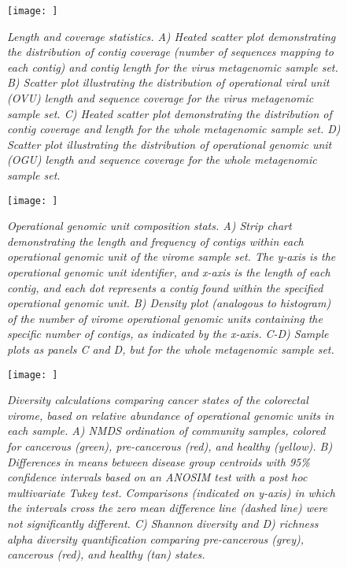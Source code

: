 \documentclass[12pt,]{article}
\begin{document}
\newpage

\begin{figure}[htbp]
\centering
\texttt{[image: ]}
\caption{\emph{Length and coverage statistics. A) Heated scatter plot
demonstrating the distribution of contig coverage (number of sequences
mapping to each contig) and contig length for the virus metagenomic
sample set. B) Scatter plot illustrating the distribution of operational
viral unit (OVU) length and sequence coverage for the virus metagenomic
sample set. C) Heated scatter plot demonstrating the distribution of
contig coverage and length for the whole metagenomic sample set. D)
Scatter plot illustrating the distribution of operational genomic unit
(OGU) length and sequence coverage for the whole metagenomic sample
set.}\label{contigqc}}
\end{figure}

\newpage

\begin{figure}[htbp]
\centering
\texttt{[image: ]}
\caption{\emph{Operational genomic unit composition stats. A) Strip
chart demonstrating the length and frequency of contigs within each
operational genomic unit of the virome sample set. The y-axis is the
operational genomic unit identifier, and x-axis is the length of each
contig, and each dot represents a contig found within the specified
operational genomic unit. B) Density plot (analogous to histogram) of
the number of virome operational genomic units containing the specific
number of contigs, as indicated by the x-axis. C-D) Sample plots as
panels C and D, but for the whole metagenomic sample
set.}\label{clustercontigqc}}
\end{figure}

\newpage

\begin{figure}[htbp]
\centering
\texttt{[image: ]}
\caption{\emph{Diversity calculations comparing cancer states of the
colorectal virome, based on relative abundance of operational genomic
units in each sample. A) NMDS ordination of community samples, colored
for cancerous (green), pre-cancerous (red), and healthy (yellow). B)
Differences in means between disease group centroids with 95\%
confidence intervals based on an ANOSIM test with a post hoc
multivariate Tukey test. Comparisons (indicated on y-axis) in which the
intervals cross the zero mean difference line (dashed line) were not
significantly different. C) Shannon diversity and D) richness alpha
diversity quantification comparing pre-cancerous (grey), cancerous
(red), and healthy (tan) states.}\label{betaogu}}
\end{figure}
\end{document}
